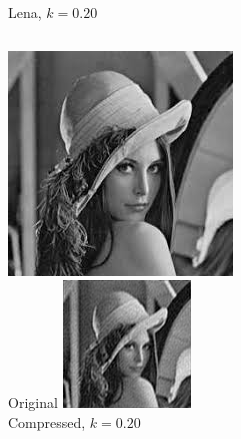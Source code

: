 \documentclass[12pt]{beamer}
\begin{document}
\begin{frame}{Lena, \(k=0.20\)}
  \begin{columns}
      \includegraphics[width=\textwidth]{Lena.jpeg}\\
      \footnotesize Original
      \includegraphics[width=\textwidth]{Lena_k20.png}\\
      \footnotesize Compressed, \(k=0.20\)
  \end{columns}
\end{frame}
\end{document}

